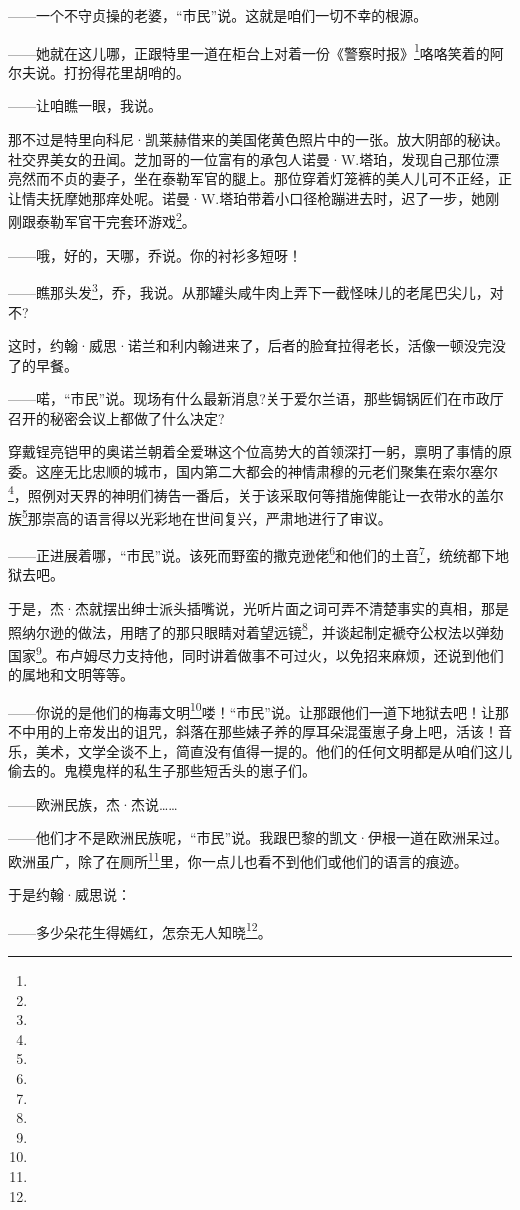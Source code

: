 \par ——一个不守贞操的老婆，“市民”说。这就是咱们一切不幸的根源。
\par ——她就在这儿哪，正跟特里一道在柜台上对着一份《警察时报》\footnote{}咯咯笑着的阿尔夫说。打扮得花里胡哨的。
\par ——让咱瞧一眼，我说。
\par 那不过是特里向科尼·凯莱赫借来的美国佬黄色照片中的一张。放大阴部的秘诀。社交界美女的丑闻。芝加哥的一位富有的承包人诺曼·W.塔珀，发现自己那位漂亮然而不贞的妻子，坐在泰勒军官的腿上。那位穿着灯笼裤的美人儿可不正经，正让情夫抚摩她那痒处呢。诺曼·W.塔珀带着小口径枪蹦进去时，迟了一步，她刚刚跟泰勒军官干完套环游戏\footnote{}。
\par ——哦，好的，天哪，乔说。你的衬衫多短呀！
\par ——瞧那头发\footnote{}，乔，我说。从那罐头咸牛肉上弄下一截怪味儿的老尾巴尖儿，对不?
\par 这时，约翰·威思·诺兰和利内翰进来了，后者的脸耷拉得老长，活像一顿没完没了的早餐。
\par ——喏，“市民”说。现场有什么最新消息?关于爱尔兰语，那些锔锅匠们在市政厅召开的秘密会议上都做了什么决定?
\par 穿戴锃亮铠甲的奥诺兰朝着全爱琳这个位高势大的首领深打一躬，禀明了事情的原委。这座无比忠顺的城市，国内第二大都会的神情肃穆的元老们聚集在索尔塞尔\footnote{}，照例对天界的神明们祷告一番后，关于该采取何等措施俾能让一衣带水的盖尔族\footnote{}那崇高的语言得以光彩地在世间复兴，严肃地进行了审议。
\par ——正进展着哪，“市民”说。该死而野蛮的撒克逊佬\footnote{}和他们的土音\footnote{}，统统都下地狱去吧。
\par 于是，杰·杰就摆出绅士派头插嘴说，光听片面之词可弄不清楚事实的真相，那是照纳尔逊的做法，用瞎了的那只眼睛对着望远镜\footnote{}，并谈起制定褫夺公权法以弹劾国家\footnote{}。布卢姆尽力支持他，同时讲着做事不可过火，以免招来麻烦，还说到他们的属地和文明等等。
\par ——你说的是他们的梅毒文明\footnote{}喽！“市民”说。让那跟他们一道下地狱去吧！让那不中用的上帝发出的诅咒，斜落在那些婊子养的厚耳朵混蛋崽子身上吧，活该！音乐，美术，文学全谈不上，简直没有值得一提的。他们的任何文明都是从咱们这儿偷去的。鬼模鬼样的私生子那些短舌头的崽子们。
\par ——欧洲民族，杰·杰说……
\par ——他们才不是欧洲民族呢，“市民”说。我跟巴黎的凯文·伊根一道在欧洲呆过。欧洲虽广，除了在厕所\footnote{}里，你一点儿也看不到他们或他们的语言的痕迹。
\par 于是约翰·威思说：
\par ——多少朵花生得嫣红，怎奈无人知晓\footnote{}。
